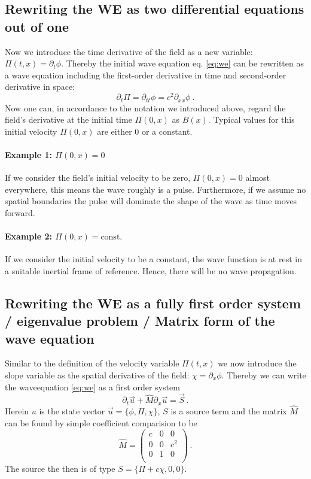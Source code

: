 \subsection{Rewriting the WE as two differential equations out of one}
Now we introduce the time derivative of the field as a new variable: $\Pi (t,x) = \partial_t \phi$. Thereby the initial wave equation eq. \ref{eq:we} can be rewritten as a wave equation including the first-order derivative in time and second-order derivative in space:
\begin{equation}
	\partial_t \Pi = \partial_{tt} \phi =  c^2 \partial_{xx}\phi ~.
\end{equation}
Now one can, in accordance to the notation we introduced above, regard the field's derivative at the initial time $\Pi(0,x)$ as $B(x)$.
Typical values for this initial velocity $\Pi (0,x)$ are either 0 or a constant.

\paragraph{Example 1: $\Pi(0,x) = 0$}
If we consider the field's initial velocity to be zero, $\Pi(0,x) = 0$ almost everywhere, this means the wave roughly is a pulse. Furthermore, if we assume no spatial boundaries the pulse will dominate the shape of the wave as time moves forward.
\paragraph{Example 2: $\Pi(0,x) = \text{const.}$}
If we consider the initial velocity to be a constant, the wave function is at rest in a suitable inertial frame of reference. Hence, there will be no wave propagation.



\subsection{Rewriting the WE as a fully first order system / eigenvalue problem / Matrix form of the wave equation}

Similar to the definition of the velocity variable $\Pi(t,x)$ we now introduce the slope variable as the spatial derivative of the field: $\chi = \partial_x \phi$.
Thereby we can write the waveequation \ref{eq:we} as a first order system
\begin{equation}
	\partial_t \vec{u} + \hat{M} \partial_x \vec{u} = \vec{S} ~.
	\label{eq:we-matrix}
\end{equation}
Herein $u$ is the state vector $\vec{u} = \{ \phi, \Pi , \chi \}$, $S$ is a source term and the matrix $\hat{M}$ can be found by simple coefficient comparision to be
\[
\hat{M} = \begin{pmatrix}
		c & 0 & 0 \\
		0 & 0 & c^2 \\
		0 & 1 & 0 \\
	\end{pmatrix}~. \]
The source the then is of type $S = \{\Pi + c \chi,0,0 \}$.


